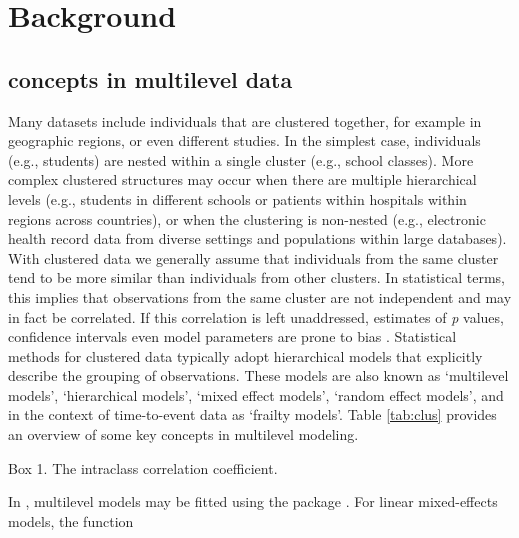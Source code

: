 \documentclass[
  article]{jss}
\begin{document}
\hypertarget{sec-models}{%
\section{Background}\label{sec-models}}

\hypertarget{concepts-in-multilevel-data}{%
\subsection{concepts in multilevel
data}\label{concepts-in-multilevel-data}}

Many datasets include individuals that are clustered together, for
example in geographic regions, or even different studies. In the
simplest case, individuals (e.g., students) are nested within a single
cluster (e.g., school classes). More complex clustered structures may
occur when there are multiple hierarchical levels (e.g., students in
different schools or patients within hospitals within regions across
countries), or when the clustering is non-nested (e.g., electronic
health record data from diverse settings and populations within large
databases). With clustered data we generally assume that individuals
from the same cluster tend to be more similar than individuals from
other clusters. In statistical terms, this implies that observations
from the same cluster are not independent and may in fact be correlated.
If this correlation is left unaddressed, estimates of \emph{p} values,
confidence intervals even model parameters are prone to bias
\citep{loca01}. Statistical methods for clustered data typically adopt
hierarchical models that explicitly describe the grouping of
observations. These models are also known as `multilevel models',
`hierarchical models', `mixed effect models', `random effect models',
and in the context of time-to-event data as `frailty models'. Table
\ref{tab:clus} provides an overview of some key concepts in multilevel
modeling.

\begin{tcolorbox}[enhanced jigsaw, toprule=.15mm, arc=.35mm, rightrule=.15mm, breakable, opacityback=0, bottomrule=.15mm, colback=white, leftrule=.75mm, left=2mm]

Box 1. The intraclass correlation coefficient.

\end{tcolorbox}

In , multilevel models may be fitted using the package
. For linear mixed-effects models, the function
\end{document}
